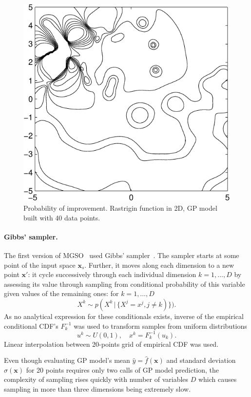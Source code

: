 \documentclass{itatnew}
\newcommand{\xx}{\mathrm{\mathbf{x}}}
\begin{document}
\begin{figure}
  \centering
  \includegraphics[width=0.6\linewidth]{poi_example}
  {\small
  \caption{Probability of improvement. Rastrigin function in 2D, GP model built with 40 data points.}
  }
  \label{fig:poi}
\end{figure}

\paragraph{Gibbs' sampler.}

The first version of MGSO~\cite{bajer_model_2013} used Gibbs' sampler~\cite{geman_stochastic_1984}. The sampler starts at some point of the input space $\xx_s$. Further, it moves along each dimension to a new point $\xx'$: it cycle successively through each individual dimension $k = 1,\ldots,D$ by assessing its value through sampling from conditional probability of this variable given values of the remaining ones: for $k=1,\ldots,D$
\begin{equation}
X^k \sim p(X^k \, | \, \{X^j = x^j, j \neq k)\}).
\end{equation}
As no analytical expression for these conditionals exists, inverse of the empirical conditional CDF's $F^{-1}_k$ was used to transform samples from uniform distributions
\begin{displaymath}
u^k \sim U(0,1), \quad  x^k = F^{-1}_k(u_k).
\end{displaymath}
Linear interpolation between 20-points grid of empirical CDF was used.

Even though evaluating GP model's mean $\hat{y} = \hat{f}(\xx)$ and standard deviation $\hat{\sigma}(\xx)$ for 20 points requires only two calls of GP model prediction, the complexity of sampling rises quickly with number of variables $D$ which causes sampling in more than three dimensions being extremely slow.
\end{document}
